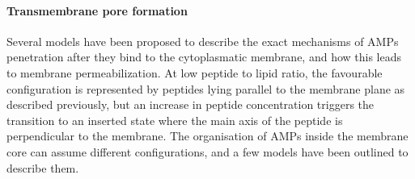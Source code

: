 \paragraph{Transmembrane pore formation} Several models have been proposed to describe the exact mechanisms of AMPs penetration after they bind to the cytoplasmatic membrane, and how this leads to membrane permeabilization.\cite{Brogden2005,Toke2005,Nguyen2011}
%
At low peptide to lipid ratio, the favourable configuration is represented by peptides lying parallel to the membrane plane as described previously, \cite{Yang2001} but an increase in peptide concentration triggers the transition to an inserted state where the main axis of the peptide is perpendicular to the membrane. The organisation of AMPs inside the membrane core can assume different configurations, and a few models have been outlined to describe them.

